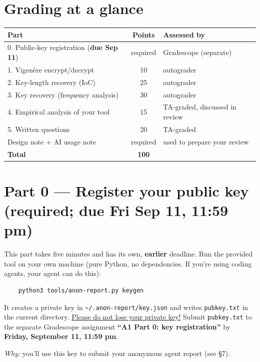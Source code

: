 \documentclass[11pt]{article}
\newcommand{\file}[1]{\texttt{#1}}
\begin{document}
\section*{Grading at a glance}
\begin{center}\small
\begin{tabular}{lcl}
\toprule
Part & Points & Assessed by \\
\midrule
0. Public-key registration (\textbf{due Sep 11}) & required & Gradescope (separate) \\
1. Vigen\`ere encrypt/decrypt & 10 & autograder \\
2. Key-length recovery (IoC) & 25 & autograder \\
3. Key recovery (frequency analysis) & 30 & autograder \\
4. Empirical analysis of your tool & 15 & TA-graded, discussed in review \\
5. Written questions & 20 & TA-graded \\
Design note + AI usage note & required & used to prepare your review \\
\midrule
\textbf{Total} & \textbf{100} & \\
\bottomrule
\end{tabular}
\end{center}

\section*{Part 0 --- Register your public key (required; due Fri Sep 11, 11:59 pm)}

This part takes five minutes and has its own, \textbf{earlier} deadline. Run the provided tool on your own machine (pure Python, no dependencies. If you're using coding agents, your agent can do this):
\begin{verbatim}
    python3 tools/anon-report.py keygen
\end{verbatim}
It creates a private key in \file{\textasciitilde/.anon-report/key.json} and writes \file{pubkey.txt} in the current directory. \underline{Please do not lose your private key!} Submit \file{pubkey.txt} to the separate Gradescope assignment \textbf{``A1 Part 0: key registration''} by \textbf{Friday, September 11, 11:59 pm}.

\medskip\noindent\emph{Why:} you'll use this key to submit your anonymous agent report (see \S7). %
\end{document}
